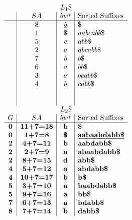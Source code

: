 \documentclass[envcountsame,runningheads]{llncs}
\begin{document}
\begin{example}
\begin{figure}[!htb]
{\scriptsize
  $$
    \begin{array}{c|c|c|l}
    \multicolumn{4}{c}{L_1\$}      \\
           & SA    & bwt   & \mbox{Sorted Suffixes} \\
\hline
           & 8     & \underline{b}     & \$ \\
           & 1     & \$    & aabcabb\$ \\
           & 5     & c     & abb\$ \\
           & 2     & a     & abcabb\$ \\
           & 7     & b     & b\$ \\
           & 6     & a     & bb\$ \\
           & 3     & a     & bcabb\$ \\
           & 4     & b     & cabb\$ \\
           &       &       &  \\
           &       &    &  \\
    \multicolumn{4}{c}{L_2\$}      \\
     G     & SA    & bwt   & \mbox{Sorted Suffixes} \\
\hline
\textbf{0} & \textbf{11+7=18} & \textbf{b} & \textbf{\$} \\
\textbf{0} & \textbf{1+7=8} & \textbf{\$} & \textbf{\underline{aabaabdabb\$}} \\
\textbf{2} & \textbf{4+7=11} & \textbf{b} & \textbf{aabdabb\$} \\
\textbf{2} & \textbf{2+7=9} & \textbf{a} & \textbf{abaabdabb\$} \\
\textbf{2} & \textbf{8+7=15} & \textbf{d} & \textbf{abb\$} \\
\textbf{4} & \textbf{5+7=12} & \textbf{a} & \textbf{abdabb\$} \\
\textbf{4} & \textbf{10+7=17} & \textbf{b} & \textbf{b\$} \\
\textbf{5} & \textbf{3+7=10} & \textbf{a} & \textbf{baabdabb\$} \\
\textbf{5} & \textbf{9+7=16} & \textbf{a} & \textbf{bb\$} \\
\textbf{7} & \textbf{6+7=13} & \textbf{a} & \textbf{bdabb\$} \\
\textbf{8} & \textbf{7+7=14} & \textbf{b} & \textbf{dabb\$} \\
    \end{array}\qquad
    \begin{array}{c}
        \\

\end{array}$$}
\end{figure}
\end{example}
\end{document}
